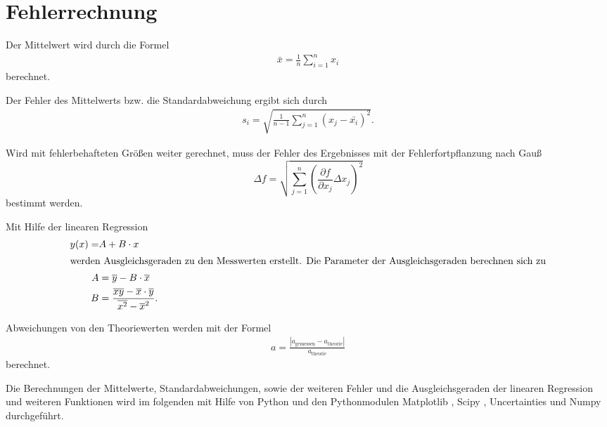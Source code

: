 \section{Fehlerrechnung}
\label{sec:Fehlerrechnung}

Der Mittelwert wird durch die Formel
\begin{align*}
    \bar{x}=\frac{1}{n} \sum_{i=1}^n x_i \label{eqn:Mittelwert}
\end{align*}
berechnet.

Der Fehler des Mittelwerts bzw. die Standardabweichung ergibt sich durch
\begin{align*}
    s_i=\sqrt{\frac{1}{n-1}\sum_{j=1}^n (x_j-\bar{x_i})^2}.
\end{align*}

Wird mit fehlerbehafteten Größen weiter gerechnet, muss der Fehler des Ergebnisses mit der Fehlerfortpflanzung nach Gauß
\begin{equation*}
    \Delta f=\sqrt{\sum_{j=1}^n \left(\frac{\partial f}{\partial x_j}\Delta x_j \right)^{2} }\label{eqn:Gauß}
\end{equation*}
bestimmt werden.

Mit Hilfe der linearen Regression 
\begin{align*}
    y(x)=&A+B\cdot x\\\label{eqn:lin}
    \intertext{werden Ausgleichsgeraden zu den Messwerten erstellt. Die Parameter der Ausgleichsgeraden berechnen sich zu}
    A&=\overline{y}-B\cdot \overline{x}\\
    B&=\frac{\overline{xy}-\overline{x}\cdot \overline{y}}{\overline{x^2}-\overline{x}^2}.
\end{align*}

Abweichungen von den Theoriewerten werden mit der Formel
\begin{align}
  a=\frac{|a_\mathrm{gemessen}-a_\mathrm{theorie}|}{a_\mathrm{theorie}} \label{eqn:abweich}
\end{align}
berechnet.

Die Berechnungen der Mittelwerte, Standardabweichungen, sowie der weiteren Fehler und die Ausgleichsgeraden der linearen Regression und weiteren Funktionen
wird im folgenden mit Hilfe von Python \cite{python} und den Pythonmodulen Matplotlib \cite{matplotlib}, Scipy \cite{scipy}, Uncertainties \cite{unceratainties} und Numpy \cite{numpy}
durchgeführt.